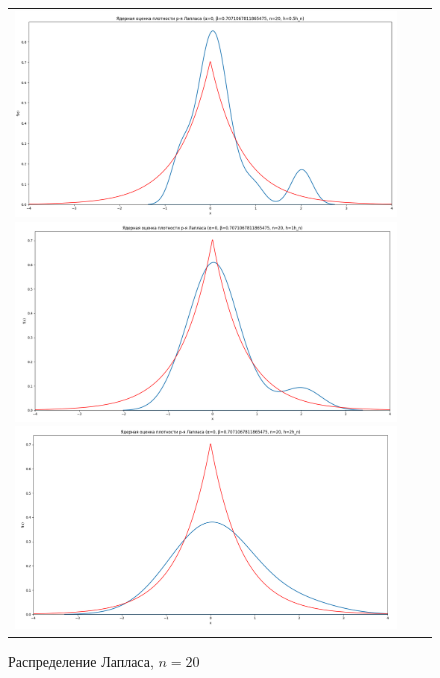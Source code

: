 \begin{figure}[H]
	\begin{tabular}{ccc}
		\includegraphics[scale=0.14]{resources/4_laplace_20_half.png}
		\includegraphics[scale=0.14]{resources/4_laplace_20_one.png}
		\includegraphics[scale=0.14]{resources/4_laplace_20_two.png}
	\end{tabular}
	\caption{Распределение Лапласа, $n=20$}
\end{figure}

